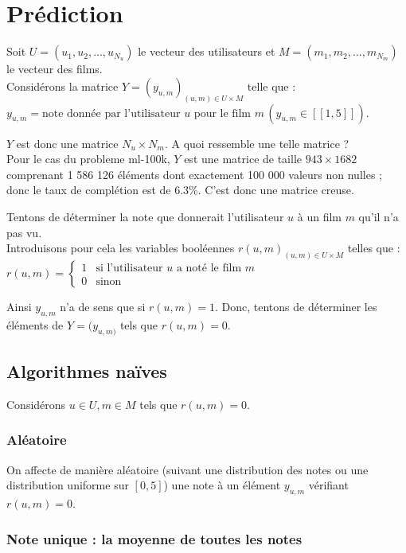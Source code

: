 \documentclass[a4paper, 11pt]{article}
\begin{document}
\section{Prédiction}

Soit $U = (u_1, u_2, ..., u_{N_u})$ le vecteur des utilisateurs et $M = (m_1, m_2, ..., m_{N_m})$ le vecteur des films. \\
Considérons la matrice $Y = (y_{u,m})_{(u, m) \in U \times M}$ telle que :\\
$y_{u,m} = \text{note donnée par l'utilisateur } u \text{ pour le film } m \, ( y_{u,m} \in [\![1,5]\!])$.

$Y$ est donc une matrice $N_u \times N_m$. A quoi ressemble une telle matrice ?\\
Pour le cas du probleme ml-100k, $Y$ est une matrice de taille $943 \times 1 682$ comprenant 1 586 126 éléments dont exactement 100 000 valeurs non nulles ; donc le taux de complétion est de 6.3\%. C'est donc une matrice creuse.
\bigskip

Tentons de déterminer la note que donnerait l'utilisateur $u$ à un film $m$ qu'il n'a pas vu. \\
Introduisons pour cela les variables booléennes $r(u,m)_{(u, m) \in U \times M}$ telles que :\\
$r(u,m) = 
\left\{
\begin{array}{ll}
1 & \text{si l'utilisateur } u \text{ a noté le film } m \\
0  & \text{sinon} \
\end{array}
\right.$ 
\medskip 

Ainsi $y_{u,m}$ n'a de sens que si $r(u,m) =1$. Donc, tentons de déterminer les éléments de $Y=(y_{u,m)}$ tels que $r(u,m)=0$.

\subsection{Algorithmes naïves}

Considérons $u \in U, m \in M$ tels que $r(u,m)=0$.

\subsubsection{Aléatoire}

On affecte de manière aléatoire (suivant une distribution des notes ou une distribution uniforme sur $[0,5]$) une note à un élément $y_{u,m}$ vérifiant $r(u,m)=0$.

\subsubsection{Note unique : la moyenne de toutes les notes}
\end{document}
